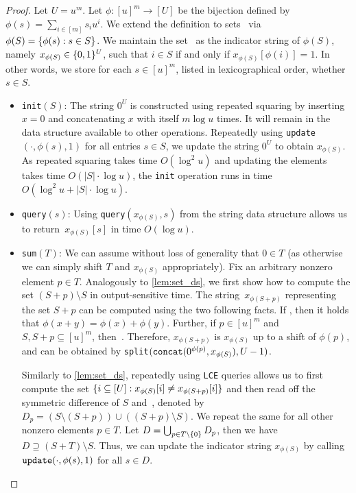 \documentclass[10pt,a4paper]{article}
\DeclarePairedDelimiter\set{\lbrace}{\rbrace}
\newcommand\Oo{O}
\newcommand{\Op}[1]{{\normalfont\texttt{#1}}}
\begin{document}
\begin{proof}
    Let $U = u^m$. Let $\phi:[u]^m \rightarrow [U]$ be the bijection defined by $\phi(s) = \sum_{i \in [m]} s_i u^i$. We extend the definition to sets~ via $\phi(S) = \set{\phi(s) : s \in S}$. We maintain the set~ as the indicator string of $\phi(S)$, namely $x_{\phi(S)} \in \set{0,1}^U$, such that $i \in S$ if and only if $x_{\phi(S)}[\phi(i)] = 1$. In other words, we store for each $s \in [u]^m$, listed in lexicographical order, whether $s \in S$.
    \smallskip
    \begin{itemize}
        \setlength\parindent{1.5em}
        \item \Op{init}$(S)$: 
        The string $0^{U}$ is constructed using repeated squaring by inserting $x=0$ and concatenating $x$ with itself $m \log u$ times.
        It will remain in the data structure available to other operations.
        Repeatedly using \Op{update}$(\cdot, \phi(s), 1)$ for all entries $s \in S$, we update the string $0^{U}$ to obtain $x_{\phi(S)}$.
        As repeated squaring takes time $\Oo(\log^2 u)$ and updating the elements takes time $\Oo(|S| \cdot \log u )$, the \Op{init} operation runs in time $\Oo(\log^2 u +|S| \cdot \log u)$.
        
        \item \Op{query}$(s)$: 
        Using \Op{query}$(x_{\phi(S)},s)$ from the string data structure allows us to return~$x_{\phi(S)}[s]$ in time $\Oo(\log u)$.
        
        \item \Op{sum}$(T)$: We can assume without loss of generality that $0 \in T$ (as otherwise we can simply shift $T$ and $x_{\phi(S)}$ appropriately). Fix an arbitrary nonzero element $p \in T$. Analogously to \cref{lem:set_ds}, we first show how to compute the set $(S + p) \setminus S$ in output-sensitive time.
        The string~$x_{\phi(S+p)}$ representing the set $S +p$ can be computed using the two following facts.
        If , then it holds that $\phi(x+y) = \phi(x) + \phi(y)$.
        Further, if $p \in [u]^m$ and $S, S+p \subseteq [u]^m$, then~.
        Therefore, $x_{\phi(S+p)}$ is $x_{\phi(S)}$ up to a shift of $\phi(p)$, and can be obtained by \Op{split}$(\Op{concat}(0^{\phi(p)}, x_{\phi(S)}), U-1)$.
        
        Similarly to \cref{lem:set_ds}, repeatedly using \Op{LCE} queries allows us to first compute the set $\set{i \subseteq [U] : x_{\phi(S)}[i] \neq x_{\phi(S+p)}[i]}$ and then read off the symmetric difference of $S$ and~, denoted by $D_p = (S \setminus (S + p)) \cup ((S + p) \setminus S)$.
        We repeat the same for all other nonzero elements $p \in T$.
        Let $D = \bigcup_{p \in T \setminus \set{0}} D_p$, then we have $D \supseteq (S + T) \setminus S$. Thus, we can update the indicator string $x_{\phi(S)}$ by calling $\Op{update}(\cdot, \phi(s), 1)$ for all $s \in D$.


\end{itemize}
\end{proof}
\end{document}
